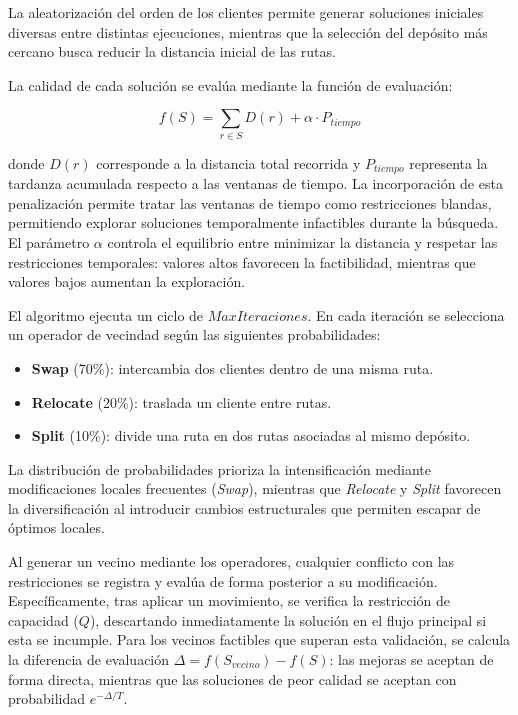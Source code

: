 \documentclass[letter, 10pt, dvipdfmx]{article}
\begin{document}
La aleatorización del orden de los clientes permite generar soluciones iniciales diversas entre distintas ejecuciones,
mientras que la selección del depósito más cercano busca reducir la distancia inicial de las rutas.

La calidad de cada solución se evalúa mediante la función de evaluación:

$$
f(S) = \sum_{r \in S} D(r) + \alpha \cdot P_{tiempo}
$$

donde $D(r)$ corresponde a la distancia total recorrida y $P_{tiempo}$ representa la tardanza acumulada respecto a las
ventanas de tiempo. La incorporación de esta penalización permite tratar las ventanas de tiempo como restricciones blandas, permitiendo explorar soluciones temporalmente
infactibles durante la búsqueda. El parámetro $\alpha$ controla el equilibrio entre minimizar la distancia
y respetar las restricciones temporales: valores altos favorecen la factibilidad, mientras que valores bajos aumentan la exploración.

El algoritmo ejecuta un ciclo de $MaxIteraciones$. En cada iteración se selecciona un operador de vecindad según las siguientes probabilidades:

\begin{itemize}
  \item \textbf{Swap} (70\%): intercambia dos clientes dentro de una misma ruta.
  \item \textbf{Relocate} (20\%): traslada un cliente entre rutas.
  \item \textbf{Split} (10\%): divide una ruta en dos rutas asociadas al mismo depósito.
\end{itemize}

La distribución de probabilidades prioriza la intensificación mediante modificaciones locales frecuentes (\textit{Swap}),
mientras que \textit{Relocate} y \textit{Split} favorecen la diversificación al introducir cambios estructurales que
permiten escapar de óptimos locales.

Al generar un vecino mediante los operadores, cualquier conflicto con las restricciones se registra y evalúa de forma posterior a su modificación.
Específicamente, tras aplicar un movimiento, se verifica la restricción de capacidad ($Q$), descartando inmediatamente la
solución en el flujo principal si esta se incumple.
Para los vecinos factibles que superan esta validación, se calcula la diferencia de evaluación
$\Delta = f(S_{vecino}) - f(S)$: las mejoras se aceptan de forma directa, mientras que las soluciones de peor calidad
se aceptan con probabilidad $e^{-\Delta/T}$.
\end{document}
